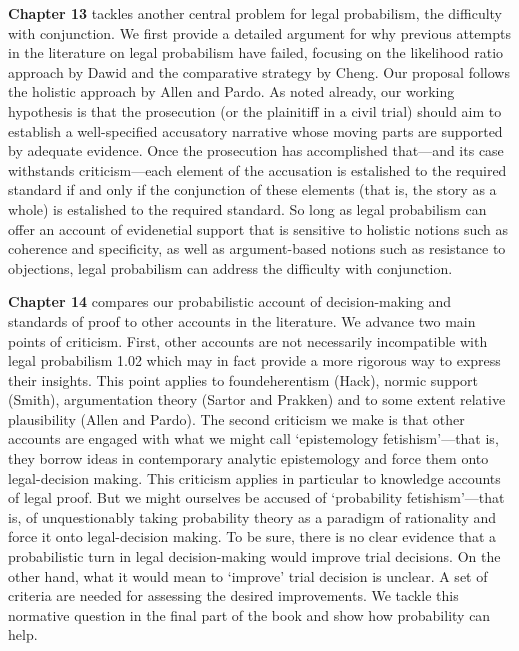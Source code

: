 \documentclass[
  10pt,
  dvipsnames,enabledeprecatedfontcommands]{scrartcl}
\begin{document}
\textbf{Chapter 13} tackles another central problem for legal
probabilism, the difficulty with conjunction. We first provide a
detailed argument for why previous attempts in the literature on legal
probabilism have failed, focusing on the likelihood ratio approach by
Dawid and the comparative strategy by Cheng. Our proposal follows the
holistic approach by Allen and Pardo. As noted already, our working
hypothesis is that the prosecution (or the plainitiff in a civil trial)
should aim to establish a well-specified accusatory narrative whose
moving parts are supported by adequate evidence. Once the prosecution
has accomplished that---and its case withstands criticism---each element
of the accusation is estalished to the required standard if and only if
the conjunction of these elements (that is, the story as a whole) is
estalished to the required standard. So long as legal probabilism can
offer an account of evidenetial support that is sensitive to holistic
notions such as coherence and specificity, as well as argument-based
notions such as resistance to objections, legal probabilism can address
the difficulty with conjunction.

\textbf{Chapter 14} compares our probabilistic account of
decision-making and standards of proof to other accounts in the
literature. We advance two main points of criticism. First, other
accounts are not necessarily incompatible with legal probabilism 1.02
which may in fact provide a more rigorous way to express their insights.
This point applies to foundeherentism (Hack), normic support (Smith),
argumentation theory (Sartor and Prakken) and to some extent relative
plausibility (Allen and Pardo). The second criticism we make is that
other accounts are engaged with what we might call `epistemology
fetishism'---that is, they borrow ideas in contemporary analytic
epistemology and force them onto legal-decision making. This criticism
applies in particular to knowledge accounts of legal proof. But we might
ourselves be accused of `probability fetishism'---that is, of
unquestionably taking probability theory as a paradigm of rationality
and force it onto legal-decision making. To be sure, there is no clear
evidence that a probabilistic turn in legal decision-making would
improve trial decisions. On the other hand, what it would mean to
`improve' trial decision is unclear. A set of criteria are needed for
assessing the desired improvements. We tackle this normative question in
the final part of the book and show how probability can help.
\end{document}
